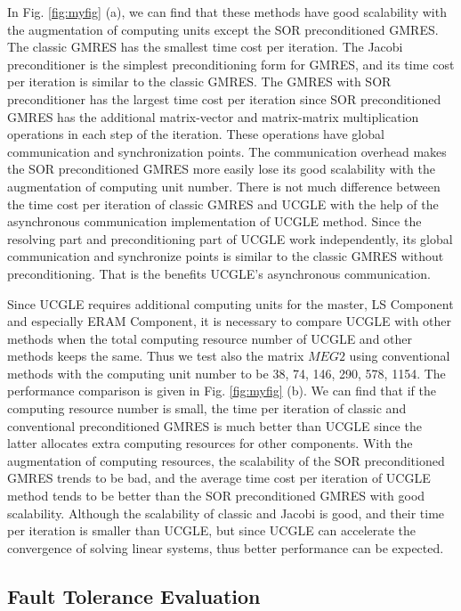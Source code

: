 In Fig. \ref{fig:myfig} (a), we can find that these methods have good scalability with the augmentation of computing units except the SOR preconditioned GMRES. The classic GMRES has the smallest time cost per iteration. The Jacobi preconditioner is the simplest preconditioning form for GMRES, and its time cost per iteration is similar to the classic GMRES. The GMRES with SOR preconditioner has the largest time cost per iteration since SOR preconditioned GMRES has the additional matrix-vector and matrix-matrix multiplication operations in each step of the iteration. These operations have global communication and synchronization points. The communication overhead makes the SOR preconditioned GMRES more easily lose its good scalability with the augmentation of computing unit number. There is not much difference between the time cost per iteration of classic GMRES and UCGLE with the help of the asynchronous communication implementation of UCGLE method. Since the resolving part and preconditioning part of UCGLE work independently, its global communication and synchronize points is similar to the classic GMRES without preconditioning. That is the benefits UCGLE's asynchronous communication. 

Since UCGLE requires additional computing units for the master, LS Component and especially ERAM Component, it is necessary to compare UCGLE with other methods when the total computing resource number of UCGLE and other methods keeps the same. Thus we test also the matrix $MEG2$ using conventional methods with the computing unit number to be 38, 74, 146, 290, 578, 1154. The performance comparison is given in Fig. \ref{fig:myfig} (b). We can find that if the computing resource number is small, the time per iteration of classic and conventional preconditioned GMRES is much better than UCGLE since the latter allocates extra computing resources for other components. With the augmentation of computing resources, the scalability of the SOR preconditioned GMRES trends to be bad, and the average time cost per iteration of UCGLE method tends to be better than the SOR preconditioned GMRES with good scalability. Although the scalability of classic and Jacobi is good, and their time per iteration is smaller than UCGLE, but since UCGLE can accelerate the convergence of solving linear systems, thus better performance can be expected.


\subsection{Fault Tolerance Evaluation}

